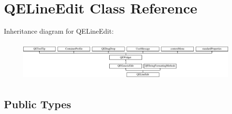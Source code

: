\hypertarget{classQELineEdit}{
\section{QELineEdit Class Reference}
\label{classQELineEdit}
}
Inheritance diagram for QELineEdit:\begin{figure}[H]
\begin{center}
\leavevmode
\includegraphics[height=2.097378cm]{classQELineEdit}
\end{center}
\end{figure}
\subsection*{Public Types}
